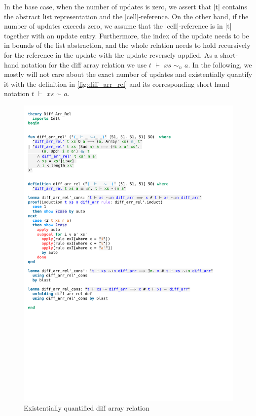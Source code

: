 \noindent In the base case, when the number of updates is zero, we assert that |t| contains the abstract list representation and the |cell|-reference. On the other hand, if the number of updates exceeds zero, we assume that the |cell|-reference is in |t| together with an update entry. Furthermore, the index of the update needs to be in bounds of the list abstraction, and the whole relation needs to hold recursively for the reference in the update with the update reversely applied. As a short-hand notation for the diff array relation we use $t$ $\vdash$ $xs$ $\sim_n$ $a$. In the following, we mostly will not care about the exact number of updates and existentially quantify it with the definition in \autoref{fig:diff_arr_rel} and its corresponding short-hand notation $t$ $\vdash$ $xs$ $\sim$ $a$.

\begin{figure}[htpb]
    \includegraphics[trim={0 21,2cm 0 7,4cm}, clip, width=1.00\textwidth]{figures/Theory_Diff_Arr_Rel.pdf}
    \caption[Existentially quantified diff array relation]{Existentially quantified diff array relation}
    \label{fig:diff_arr_rel}
\end{figure}

